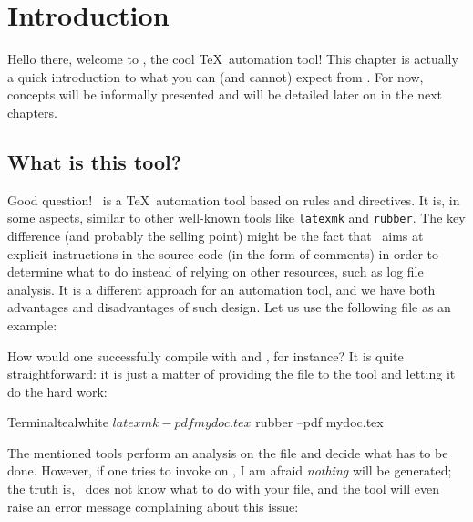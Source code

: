 \chapter{Introduction}
\label{chap:introduction}

Hello there, welcome to \arara, the cool \TeX\ automation tool! This chapter is actually a quick introduction to what you can (and cannot) expect from \arara. For now, concepts will be informally presented and will be detailed later on in the next chapters.

\section{What is this tool?}
\label{sec:whatisthistool}

Good question! \arara\ is a \TeX\ automation tool based on rules and directives. It is, in some aspects, similar to other well-known tools like \verb|latexmk| and \verb|rubber|. The key difference (and probably the selling point) might be the fact that \arara\ aims at explicit instructions in the source code (in the form of comments) in order to determine what to do instead of relying on other resources, such as log file analysis. It is a different approach for an automation tool, and we have both advantages and disadvantages of such design. Let us use the following file  as an example:


How would one successfully compile  with  and , for instance? It is quite straightforward: it is just a matter of providing the file to the tool and letting it do the hard work:

\begin{codebox}{Terminal}{teal}{\icnote}{white}
$ latexmk -pdf mydoc.tex
$ rubber --pdf mydoc.tex
\end{codebox}

The mentioned tools perform an analysis on the file and decide what has to be done. However, if one tries to invoke  on , I am afraid \emph{nothing} will be generated; the truth is, \arara\ does not know what to do with your file, and the tool will even raise an error message complaining about this issue:

